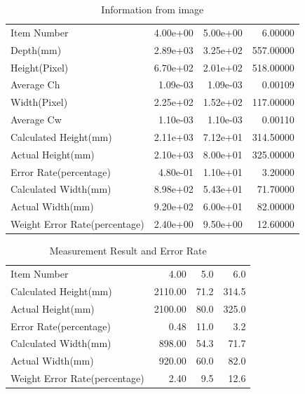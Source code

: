 \documentclass[
  oneside]{ubcthesis}
\begin{document}
\begin{table}

\caption{\label{tab:mytable2}Information from image}
\centering
\begin{tabular}[t]{lrrr}
\toprule
Item Number & 4.00e+00 & 5.00e+00 & 6.00000\\
Depth(mm) & 2.89e+03 & 3.25e+02 & 557.00000\\
Height(Pixel) & 6.70e+02 & 2.01e+02 & 518.00000\\
Average Ch & 1.09e-03 & 1.09e-03 & 0.00109\\
Width(Pixel) & 2.25e+02 & 1.52e+02 & 117.00000\\
\addlinespace
Average Cw & 1.10e-03 & 1.10e-03 & 0.00110\\
Calculated Height(mm) & 2.11e+03 & 7.12e+01 & 314.50000\\
Actual Height(mm) & 2.10e+03 & 8.00e+01 & 325.00000\\
Error Rate(percentage) & 4.80e-01 & 1.10e+01 & 3.20000\\
Calculated Width(mm) & 8.98e+02 & 5.43e+01 & 71.70000\\
\addlinespace
Actual Width(mm) & 9.20e+02 & 6.00e+01 & 82.00000\\
Weight Error Rate(percentage) & 2.40e+00 & 9.50e+00 & 12.60000\\
\bottomrule
\end{tabular}
\end{table}

\begin{table}

\caption{\label{tab:mytable3}Measurement Result and Error Rate}
\centering
\begin{tabular}[t]{lrrr}
\toprule
Item Number & 4.00 & 5.0 & 6.0\\
Calculated Height(mm) & 2110.00 & 71.2 & 314.5\\
Actual Height(mm) & 2100.00 & 80.0 & 325.0\\
Error Rate(percentage) & 0.48 & 11.0 & 3.2\\
Calculated Width(mm) & 898.00 & 54.3 & 71.7\\
\addlinespace
Actual Width(mm) & 920.00 & 60.0 & 82.0\\
Weight Error Rate(percentage) & 2.40 & 9.5 & 12.6\\
\bottomrule
\end{tabular}
\end{table}
\end{document}
